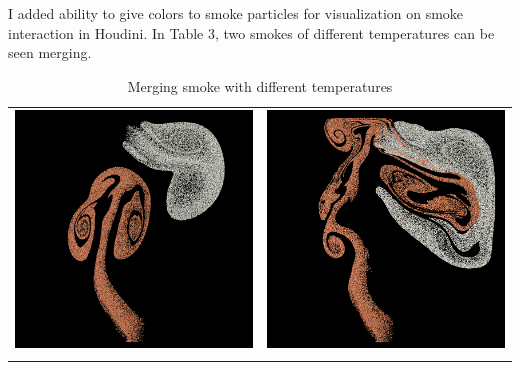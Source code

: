 \documentclass[a4paper,11pt]{article}
\theoremstyle{mytheor}
\begin{document}
\par
\noindent
I added ability to give colors to smoke particles for visualization on smoke interaction in Houdini. In Table 3, two smokes of different temperatures can be seen merging.

\begin{table}[H]
\caption{Merging smoke with different temperatures}
\centering
\begin{tabular}{cc}
\includegraphics[width=70mm]{interacting2_2.png} &\includegraphics[width=70mm]{interacting2_3.png}\\
\newline

\end{tabular}
\end{table}
\end{document}
